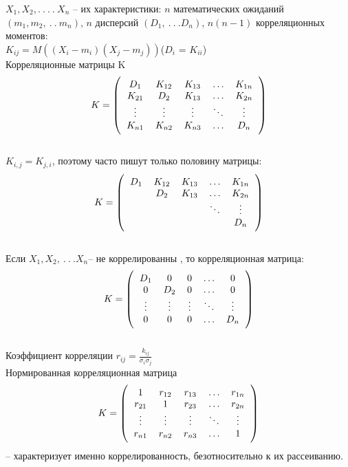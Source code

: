 \documentclass[russian, 12pt, fleqn]{article}
\begin{document}
$X_1, X_2, .\ .\ .\ .\ X_n$ -- их характеристики: $n$ математических ожиданий $(m_1, m_2, \ .\ . \  m_n)$, $n$ дисперсий $(D_1, \ .\ .\ . D_n)$,  $n(n-1)$ корреляционных моментов:\\
$K_{ij} = M((X_i - m_i)(X_j - m_j))$($D_i$ = $K_{ii}$)\\
Корреляционные матрицы K
$$
K=\left(\begin{tabular}{c c c c c}
\(D_1\) & \(K_{12}\) & \(K_{13}\) & \(\ldots\) & \(K_{1n}\) \\
\(K_{21}\) &\( D_2\) & \(K_{13}\) & \(\ldots\) &\( K_{2n}\)\\
\(\vdots\) & \(\vdots\) & \(\vdots\) & \(\ddots\) & \(\vdots\) \\
\(K_{n1}\)& \(K_{n2}\) &\( K_{n3}\) & \(\ldots\) & \(D_n\)\\	
\end{tabular}\right)$$\\
$K_{i, j} = K_{j, i}$, поэтому часто пишут только половину матрицы:\\

$$
K=\left(\begin{tabular}{c c c c c}
\(D_1\) & \(K_{12}\) & \(K_{13}\) & \(\ldots\) & \(K_{1n}\) \\
 &\( D_2\) & \(K_{13}\) & \(\ldots\) &\( K_{2n}\)\\
 &  &  & \(\ddots\) & \(\vdots\) \\
 &  & & & \(D_n\)\\	
\end{tabular}\right)$$\\

Если $X_1, X_2, \ .\ .\ . X_n$-- не коррелированны , то корреляционная матрица:\\
$$
K=\left(\begin{tabular}{c c c c c}
\(D_1\) & \(0\) & \(0\) & \(\ldots\) & \(0\) \\
\(0\) &\( D_2\) & \(0\) & \(\ldots\) &\( 0\)\\
\(\vdots\) & \(\vdots\) & \(\vdots\) & \(\ddots\) & \(\vdots\) \\
\(0\)& \(0\) &\(0\) & \(\ldots\) & \(D_n\)\\	
\end{tabular}\right)$$\\
Коэффициент корреляции $r_{ij} = \frac{k_{ij}}{\sigma_i \sigma_j}$\\
Нормированная корреляционная матрица
$$
K=\left(\begin{tabular}{c c c c c}
\(1\) & \(r_{12}\) & \(r_{13}\) & \(\ldots\) & \(r_{1n}\) \\
\(r_{21}\) &\(1\) & \(r_{23}\) & \(\ldots\) &\( r_{2n}\)\\
\(\vdots\) & \(\vdots\) & \(\vdots\) & \(\ddots\) & \(\vdots\) \\
\(r_{n1}\)& \(r_{n2}\) &\( r_{n3}\) & \(\ldots\) & \(1\)\\
\end{tabular}\right)$$
-- характеризует именно коррелированность, безотносительно  к их рассеиванию.
\end{document}
